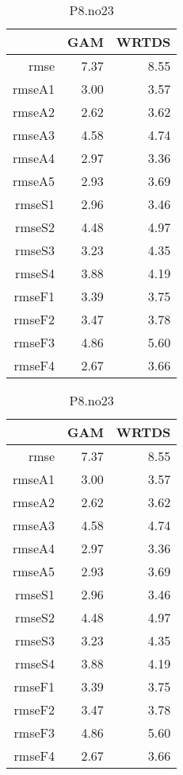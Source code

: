 \documentclass[12pt]{amsart}
\begin{document}
\begin{table}[H]
\centering
\begin{tabular}{rrr}
  \hline
 & GAM & WRTDS \\ 
  \hline
rmse & 7.37 & 8.55 \\ 
  rmseA1 & 3.00 & 3.57 \\ 
  rmseA2 & 2.62 & 3.62 \\ 
  rmseA3 & 4.58 & 4.74 \\ 
  rmseA4 & 2.97 & 3.36 \\ 
  rmseA5 & 2.93 & 3.69 \\ 
  rmseS1 & 2.96 & 3.46 \\ 
  rmseS2 & 4.48 & 4.97 \\ 
  rmseS3 & 3.23 & 4.35 \\ 
  rmseS4 & 3.88 & 4.19 \\ 
  rmseF1 & 3.39 & 3.75 \\ 
  rmseF2 & 3.47 & 3.78 \\ 
  rmseF3 & 4.86 & 5.60 \\ 
  rmseF4 & 2.67 & 3.66 \\ 
   \hline
\end{tabular}
\caption{P8.no23}
\end{table}

\begin{table}[H]
\centering
\begin{tabular}{rrr}
  \hline
 & GAM & WRTDS \\ 
  \hline
rmse & 7.37 & 8.55 \\ 
  rmseA1 & 3.00 & 3.57 \\ 
  rmseA2 & 2.62 & 3.62 \\ 
  rmseA3 & 4.58 & 4.74 \\ 
  rmseA4 & 2.97 & 3.36 \\ 
  rmseA5 & 2.93 & 3.69 \\ 
  rmseS1 & 2.96 & 3.46 \\ 
  rmseS2 & 4.48 & 4.97 \\ 
  rmseS3 & 3.23 & 4.35 \\ 
  rmseS4 & 3.88 & 4.19 \\ 
  rmseF1 & 3.39 & 3.75 \\ 
  rmseF2 & 3.47 & 3.78 \\ 
  rmseF3 & 4.86 & 5.60 \\ 
  rmseF4 & 2.67 & 3.66 \\ 
   \hline
\end{tabular}
\caption{P8.no23}
\end{table}
\end{document}
